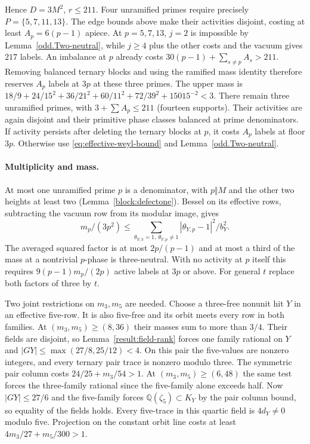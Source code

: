 \documentclass[11pt]{amsart}
\numberwithin{equation}{section}
\theoremstyle{definition}
\theoremstyle{plain}
\newcommand{\QQ}{\mathbb Q}
\begin{document}
Hence $D=3M^2$, $r\le211$. Four unramified primes require precisely
$P=\{5,7,11,13\}$. The edge bounds above make their activities disjoint,
costing at least $A_p=6(p-1)$ apiece. At $p=5,7,13$, $j=2$ is impossible
by Lemma~\ref{odd.Two-neutral}, while $j\ge4$ plus the other costs and the
vacuum gives $217$ labels. An imbalance at $p$ already costs
$30(p-1)+\sum_{s\ne p}A_s>211$. Removing balanced ternary blocks and
using the ramified mass identity therefore reserves $A_p$ labels at $3p$
at these three primes. The upper mass is
$18/9+24/15^2+36/21^2+60/11^2+72/39^2+15015^{-2}<3$.
There remain three unramified primes, with $3+\sum A_p\le211$ (fourteen
supports). Their activities are again disjoint and their primitive phase
classes balanced at prime denominators. If activity persists after
deleting the ternary blocks at $p$, it costs $A_p$ labels at floor $3p$.
Otherwise use \eqref{eq:effective-weyl-bound} and Lemma~\ref{odd.Two-neutral}.

\paragraph{Multiplicity and mass.}
At most one unramified prime $p$ is a denominator, with $p\Vert M$ and
the other two heights at least two (Lemma~\ref{block:defectone}).
Bessel on its effective rows, subtracting the vacuum row from its modular
image, gives
\[
 m_p/(3p^2)\le\sum_{\theta_{Y,3}=1,\ \theta_{Y,p}\ne1}
                     |\theta_{Y,p}-1|^2/b_Y^2.
\]
The averaged squared factor is at most $2p/(p-1)$ and at most a third
of the mass at a nontrivial $p$-phase is three-neutral. With no activity
at $p$ itself this requires $9(p-1)m_p/(2p)$ active labels at $3p$ or
above. For general $t$ replace both factors of three by $t$.

Two joint restrictions on $m_3,m_5$ are needed. Choose a three-free
nonunit hit $Y$ in an effective five-row. It is also five-free and its
orbit meets every row in both families. At $(m_3,m_5)\ge(8,36)$ their
masses sum to more than $3/4$. Their fields are disjoint, so
Lemma~\ref{result:field-rank} forces one family rational on $Y$ and
$|G Y|\le\max(27/8,25/12)<4$. On this pair the five-values are nonzero
integers, and every ternary pair trace is nonzero modulo three. The
symmetric pair column costs $24/25+m_3/54>1$. At $(m_3,m_5)\ge(6,48)$
the same test forces the three-family rational since the five-family
alone exceeds half. Now $|G Y|\le27/6$ and the five-family forces
$\QQ(\zeta_5)\subset K_Y$ by the pair column bound, so equality of the
fields holds. Every five-trace in this quartic field is $4d_Y\ne0$
modulo five. Projection on the constant orbit line costs at least
$4m_3/27+m_5/300>1$.
\end{document}
